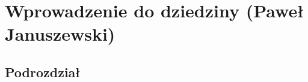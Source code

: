 \chapter{Wprowadzenie do dziedziny (Paweł Januszewski)}
\label{chap:field}




\section{Podrozdział}
